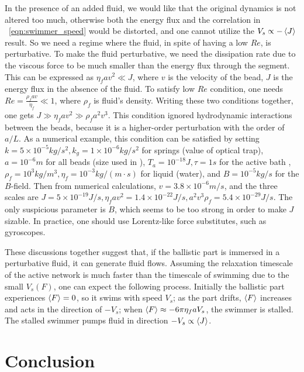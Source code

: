 \documentclass[
 preprint,
 preprintnumbers,
 amsmath,amssymb,
 aps,
 pre,
 longbibliography,
 10pt, twocolumn
]{revtex4-1}
\begin{document}
In the presence of an added fluid, we would like that the original dynamics is not altered too much, otherwise both the energy flux and the correlation in \eqnname~\eqref{eqn:swimmer_speed} would be distorted, and one cannot utilize the $V_s \propto -\expval{J}$ result.
So we need a regime where the fluid, in spite of having a low $Re$, is perturbative.
To make the fluid perturbative, we need the dissipation rate due to the viscous force to be much smaller than the energy flux through the segment. This can be expressed as $\eta_f a v^2 \ll J$, where $v$ is the velocity of the bead, $J$ is the energy flux in the absence of the fluid.
To satisfy low $Re$ condition, one needs $Re = \frac{\rho_f a v}{\eta_f} \ll 1$, where $\rho_f$ is fluid's density.
Writing these two conditions together, one gets $J \gg \eta_f a v^2 \gg \rho_f a^2 v^3$.
This condition ignored hydrodynamic interactions between the beads, because it is a higher-order perturbation with the order of $a/L$.
As a numerical example, this condition can be satisfied by setting $k=5\times 10^{-5} kg/s^2, k_g=1\times 10^{-6} kg/s^2$ for springs (value of optical trap), $a=10^{-6}m$ for all beads (size used in \cite{Leoni2009ANumber}), $T_a=10^{-18} J, \tau=1s$ for the active bath \cite{Wu2000ParticleBath}, $\rho_f=10^3kg/m^3, \eta_f=10^{-3}kg/(m\cdot s)$ for liquid (water), and $B=10^{-5} kg/s$ for the $B$-field.
Then from numerical calculations, $v=3.8\times 10^{-6}m/s$, and the three scales are $J=5\times 10^{-19}J/s, \eta_f av^2=1.4\times 10^{-22}J/s, a^2v^3\rho_f=5.4\times 10^{-29}J/s$.
The only suspicious parameter is $B$, which seems to be too strong in order to make $J$ sizable. In practice, one should use Lorentz-like force substitutes, such as gyroscopes.

These discussions together suggest that, if the ballistic part is immersed in a perturbative fluid, it can generate fluid flows.
Assuming the relaxation timescale of the active network is much faster than the timescale of swimming due to the small $V_s(F)$, one can expect the following process. Initially the ballistic part experiences $\expval{F}=0$, so it swims with speed $V_s$; as the part drifts, $\expval{F}$ increases and acts in the direction of $-V_s$; when $\expval{F} \approx -6\pi\eta_f a V_s$, the swimmer is stalled. The stalled swimmer pumps fluid in direction $-V_s \propto \expval{J}$.


\section{Conclusion} \label{sec:conclusion}
\end{document}
